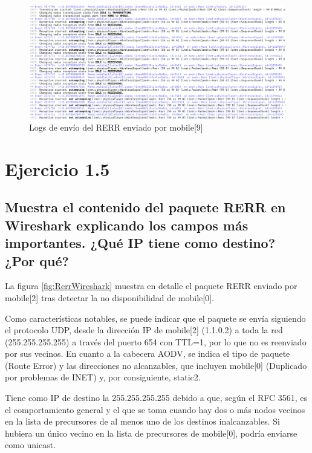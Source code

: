 \begin{figure}[H]
    \centering
    \includegraphics[width=125mm, scale=0.75]{imaxes/aodv/ejercicio4_5.png}
    \caption{Logs de envío del RERR enviado por mobile[9]}
    \label{fig:transmisioncaida}
\end{figure}

\vspace{1.25cm}
\newpage
\section{Ejercicio 1.5}

\subsection{Muestra el contenido del paquete RERR en Wireshark explicando los campos más importantes. ¿Qué IP
tiene como destino? ¿Por qué?}

La figura \ref{fig:RerrWireshark} muestra en detalle el paquete RERR enviado por mobile[2] tras detectar la no disponibilidad de mobile[0]. 

Como características notables, se puede indicar que el paquete se envía siguiendo el protocolo UDP, desde la dirección IP de mobile[2] (1.1.0.2) a toda la red (255.255.255.255) a través del puerto 654 con TTL=1, por lo que no es reenviado por sus vecinos. En cuanto a la cabecera AODV, se indica el tipo de paquete (Route Error) y las direcciones no alcanzables, que incluyen mobile[0] (Duplicado por problemas de INET) y, por consiguiente, static2.

Tiene como IP de destino la 255.255.255.255 debido a que, según el RFC 3561, es el comportamiento general y el que se toma cuando hay dos o más nodos vecinos en la lista de precursores de al menos uno de los destinos inalcanzables. Si hubiera un único vecino en la lista de precursores de mobile[0], podría enviarse como unicast.

